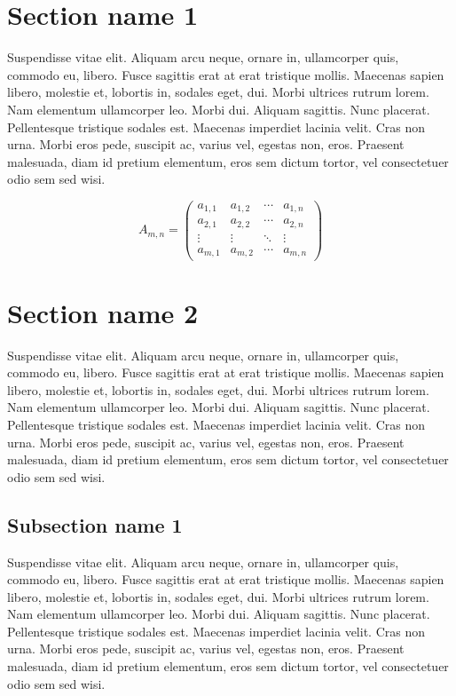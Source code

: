 \documentclass[Main]{subfiles}
\begin{document}
\section{Section name 1} %
	\label{sec:section_name_1}
	Suspendisse vitae elit. Aliquam arcu neque, ornare in, ullamcorper quis, commodo eu, libero.
	Fusce sagittis erat at erat tristique mollis. 
	Maecenas sapien libero, molestie et, lobortis in, sodales eget, dui.
	Morbi ultrices rutrum lorem.
	Nam elementum ullamcorper leo. Morbi dui. Aliquam sagittis. 
	Nunc placerat. Pellentesque tristique sodales est. Maecenas imperdiet lacinia velit. 
	Cras non urna.
	Morbi eros pede, suscipit ac, varius vel, egestas non, eros. 
	Praesent malesuada, diam id pretium elementum, eros sem dictum tortor, vel consectetuer odio sem sed wisi.

	\begin{equation}
		A_{m,n} =
		\begin{pmatrix}
			a_{1,1} & a_{1,2} & \cdots & a_{1,n} \\
			a_{2,1} & a_{2,2} & \cdots & a_{2,n} \\
			\vdots  & \vdots  & \ddots & \vdots  \\
			a_{m,1} & a_{m,2} & \cdots & a_{m,n}
		\end{pmatrix}
		\label{eq:EX_martrix}
	\end{equation}


\section{Section name 2} %
	\label{sec:section_name_2}
	Suspendisse vitae elit. Aliquam arcu neque, ornare in, ullamcorper quis, commodo eu, libero.
	Fusce sagittis erat at erat tristique mollis. 
	Maecenas sapien libero, molestie et, lobortis in, sodales eget, dui.
	Morbi ultrices rutrum lorem.
	Nam elementum ullamcorper leo. Morbi dui. Aliquam sagittis. 
	Nunc placerat. Pellentesque tristique sodales est. Maecenas imperdiet lacinia velit. 
	Cras non urna.
	Morbi eros pede, suscipit ac, varius vel, egestas non, eros. 
	Praesent malesuada, diam id pretium elementum, eros sem dictum tortor, vel consectetuer odio sem sed wisi.

	\subsection{Subsection name 1} %
		\label{sub:subsection_name_1}
		Suspendisse vitae elit. Aliquam arcu neque, ornare in, ullamcorper quis, commodo eu, libero.
		Fusce sagittis erat at erat tristique mollis. 
		Maecenas sapien libero, molestie et, lobortis in, sodales eget, dui.
		Morbi ultrices rutrum lorem.
		Nam elementum ullamcorper leo. Morbi dui. Aliquam sagittis. 
		Nunc placerat. Pellentesque tristique sodales est. Maecenas imperdiet lacinia velit. 
		Cras non urna.
		Morbi eros pede, suscipit ac, varius vel, egestas non, eros. 
		Praesent malesuada, diam id pretium elementum, eros sem dictum tortor, vel consectetuer odio sem sed wisi.
\end{document}

